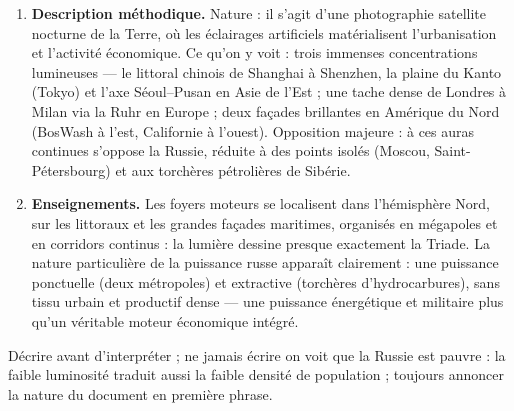 \documentclass[11pt]{article}
\begin{document}
\begin{corrige}
\begin{enumerate}
\item \textbf{Description méthodique.} Nature : il s'agit d'une photographie satellite nocturne de la Terre, où les éclairages artificiels matérialisent l'urbanisation et l'activité économique. Ce qu'on y voit : trois immenses concentrations lumineuses — le littoral chinois de Shanghai à Shenzhen, la plaine du Kanto (Tokyo) et l'axe Séoul--Pusan en Asie de l'Est ; une tache dense de Londres à Milan via la Ruhr en Europe ; deux façades brillantes en Amérique du Nord (BosWash à l'est, Californie à l'ouest). Opposition majeure : à ces auras continues s'oppose la Russie, réduite à des points isolés (Moscou, Saint-Pétersbourg) et aux torchères pétrolières de Sibérie.
\item \textbf{Enseignements.} Les foyers moteurs se localisent dans l'hémisphère Nord, sur les littoraux et les grandes façades maritimes, organisés en mégapoles et en corridors continus : la lumière dessine presque exactement la Triade. La nature particulière de la puissance russe apparaît clairement : une puissance ponctuelle (deux métropoles) et extractive (torchères d'hydrocarbures), sans tissu urbain et productif dense — une puissance énergétique et militaire plus qu'un véritable moteur économique intégré.
\end{enumerate}
\begin{attention}
Décrire avant d'interpréter ; ne jamais écrire \og on voit que la Russie est pauvre \fg{} : la faible luminosité traduit aussi la faible densité de population ; toujours annoncer la nature du document en première phrase.
\end{attention}
\end{corrige}
\end{document}
